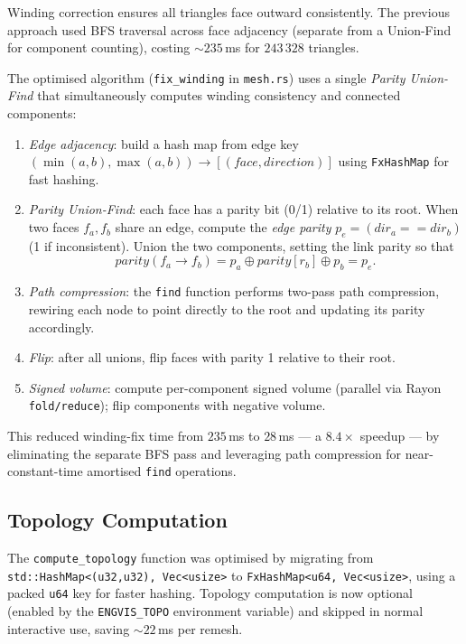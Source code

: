 \documentclass[11pt]{article}
\begin{document}
Winding correction ensures all triangles face outward consistently.
The previous approach used BFS traversal across face adjacency
(separate from a Union-Find for component counting), costing
$\sim 235$\,ms for $243\,328$ triangles.

The optimised algorithm (\texttt{fix\_winding} in \texttt{mesh.rs})
uses a single \emph{Parity Union-Find} that simultaneously computes
winding consistency and connected components:
\begin{enumerate}[leftmargin=2em]
  \item \emph{Edge adjacency}: build a hash map from edge key
        $(\min(a,b), \max(a,b)) \to [(face, direction)]$ using
        \texttt{FxHashMap} for fast hashing.
  \item \emph{Parity Union-Find}: each face has a parity bit (0/1)
        relative to its root.  When two faces $f_a, f_b$ share an edge,
        compute the \emph{edge parity} $p_e = (dir_a == dir_b)$ (1 if
        inconsistent).  Union the two components, setting the link
        parity so that
        \begin{equation}
          parity(f_a \to f_b) = p_a \oplus parity[r_b] \oplus p_b = p_e.
        \end{equation}
  \item \emph{Path compression}: the \texttt{find} function performs
        two-pass path compression, rewiring each node to point directly
        to the root and updating its parity accordingly.
  \item \emph{Flip}: after all unions, flip faces with parity 1
        relative to their root.
  \item \emph{Signed volume}: compute per-component signed volume
        (parallel via Rayon \texttt{fold/reduce}); flip components
        with negative volume.
\end{enumerate}
This reduced winding-fix time from $235$\,ms to $28$\,ms --- a
$\mathbf{8.4\times}$ speedup --- by eliminating the separate BFS pass
and leveraging path compression for near-constant-time amortised
\texttt{find} operations.

\subsection{Topology Computation}\label{sec:topo}

The \texttt{compute\_topology} function was optimised by migrating
from \texttt{std::HashMap<(u32,u32), Vec<usize>} to
\texttt{FxHashMap<u64, Vec<usize>}, using a packed \texttt{u64} key
for faster hashing.  Topology computation is now optional
(enabled by the \texttt{ENGVIS\_TOPO} environment variable) and
skipped in normal interactive use, saving $\sim 22$\,ms per remesh.
\end{document}
